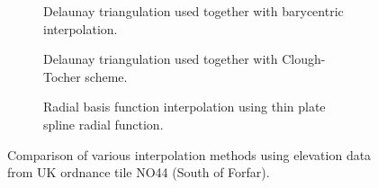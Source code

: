 \documentclass[a4paper,10pt]{report}
\begin{document}
\begin{figure}[H]
    \centering
    \begin{subfigure}{\textwidth}
        
    \caption{Delaunay triangulation used together with barycentric interpolation.}
    \end{subfigure}
    \begin{subfigure}{\textwidth}
        
    \caption{Delaunay triangulation used together with Clough-Tocher scheme.}
    \end{subfigure}
    \begin{subfigure}{\textwidth}
        
    \caption{Radial basis function interpolation using thin plate spline radial function.}
    \end{subfigure}
    \caption{Comparison of various interpolation methods using elevation data from UK ordnance tile NO44 (South of Forfar).}
    \label{fig:2D_discretized_comparison}
\end{figure}
\end{document}
